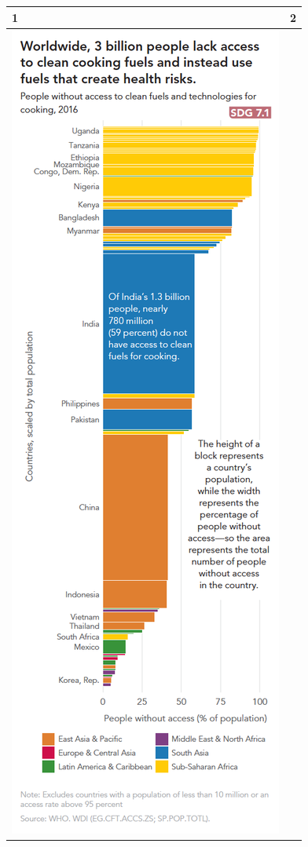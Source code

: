 \documentclass[]{book}
\theoremstyle{definition}
\theoremstyle{definition}
\theoremstyle{definition}
\theoremstyle{remark}
\begin{document}
\begin{longtable}[]{@{}ll@{}}
\toprule
1 & 2\tabularnewline
\midrule
\endhead
\includegraphics{images/case_study_4.png} &

\end{longtable}
\end{document}
